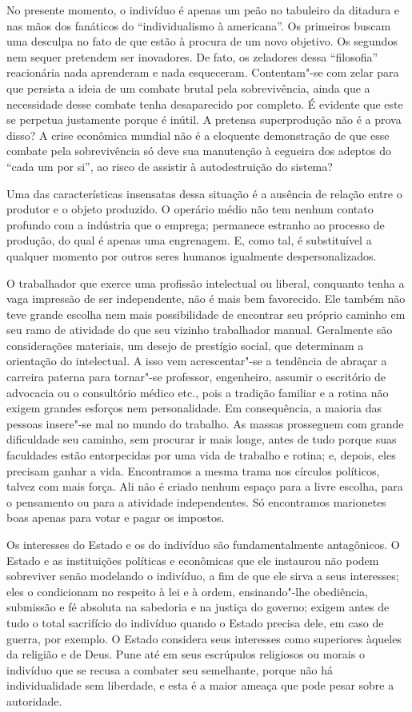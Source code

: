 No presente momento, o indivíduo é apenas um peão no tabuleiro da
ditadura e nas mãos dos fanáticos do “individualismo à americana”. Os
primeiros buscam uma desculpa no fato de que estão à procura de um novo
objetivo. Os segundos nem sequer pretendem ser inovadores. De fato, os
zeladores dessa “filosofia” reacionária nada aprenderam e nada
esqueceram. Contentam"-se com zelar para que persista a ideia de um
combate brutal pela sobrevivência, ainda que a necessidade desse
combate tenha desaparecido por completo. É evidente que este se
perpetua justamente porque é inútil. A pretensa superprodução não é a
prova disso? A crise econômica mundial não é a eloquente demonstração
de que esse combate pela sobrevivência só deve sua manutenção à
cegueira dos adeptos do “cada um por si”, ao risco de assistir à
autodestruição do sistema?

Uma das características insensatas dessa situação é a ausência de
relação entre o produtor e o objeto produzido. O operário médio não tem
nenhum contato profundo com a indústria que o emprega; permanece
estranho ao processo de produção, do qual é apenas uma engrenagem. E,
como tal, é substituível a qualquer momento por outros seres humanos
igualmente despersonalizados.

O trabalhador que exerce uma profissão intelectual ou liberal, conquanto
tenha a vaga impressão de ser independente, não é mais bem favorecido.
Ele também não teve grande escolha nem mais possibilidade de encontrar
seu próprio caminho em seu ramo de atividade do que seu vizinho
trabalhador manual. Geralmente são considerações materiais, um desejo
de prestígio social, que determinam a orientação do intelectual. A isso
vem acrescentar"-se a tendência de abraçar a carreira paterna para
tornar"-se professor, engenheiro, assumir o escritório de advocacia ou
o consultório médico etc., pois a tradição familiar e a rotina não
exigem grandes esforços nem personalidade. Em consequência, a maioria
das pessoas insere"-se mal no mundo do trabalho. As massas prosseguem
com grande dificuldade seu caminho, sem procurar ir mais longe, antes de
tudo porque suas faculdades estão entorpecidas por uma vida de trabalho
e rotina; e, depois, eles precisam ganhar a vida. Encontramos a mesma
trama nos círculos políticos, talvez com mais força. Ali não é criado
nenhum espaço para a livre escolha, para o pensamento ou para a
atividade independentes. Só encontramos marionetes boas apenas para
votar e pagar os impostos.

Os interesses do Estado e os do indivíduo são fundamentalmente
antagônicos. O Estado e as instituições políticas e econômicas que ele
instaurou não podem sobreviver senão modelando o indivíduo, a fim de que
ele sirva a seus interesses; eles o condicionam no respeito à lei e à
ordem, ensinando"-lhe obediência, submissão e fé absoluta na sabedoria
e na justiça do governo; exigem antes de tudo o total sacrifício do
indivíduo quando o Estado precisa dele, em caso de guerra, por exemplo.
O Estado considera seus interesses como superiores àqueles da religião e de
Deus. Pune até em seus escrúpulos religiosos ou morais o indivíduo que
se recusa a combater seu semelhante, porque não há individualidade sem
liberdade, e esta é a maior ameaça que pode pesar sobre a
autoridade.

